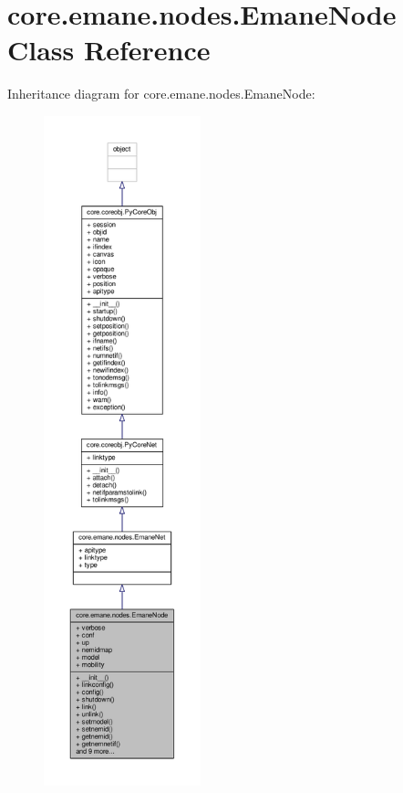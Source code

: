 \hypertarget{classcore_1_1emane_1_1nodes_1_1_emane_node}{\section{core.\+emane.\+nodes.\+Emane\+Node Class Reference}
\label{classcore_1_1emane_1_1nodes_1_1_emane_node}
}


Inheritance diagram for core.\+emane.\+nodes.\+Emane\+Node\+:
\nopagebreak
\begin{figure}[H]
\begin{center}
\leavevmode
\includegraphics[height=550pt]{classcore_1_1emane_1_1nodes_1_1_emane_node__inherit__graph}
\end{center}
\end{figure}


